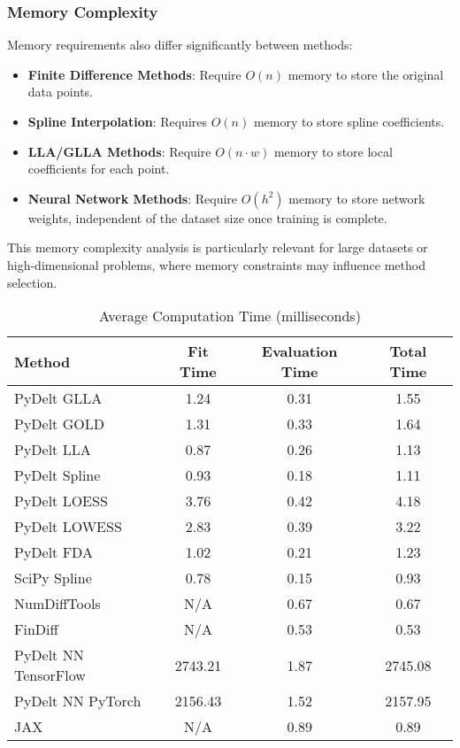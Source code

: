\documentclass[10pt,journal,compsoc]{IEEEtran}
\begin{document}
\subsubsection{Memory Complexity}

Memory requirements also differ significantly between methods:

\begin{itemize}
    \item \textbf{Finite Difference Methods}: Require $O(n)$ memory to store the original data points.
    
    \item \textbf{Spline Interpolation}: Requires $O(n)$ memory to store spline coefficients.
    
    \item \textbf{LLA/GLLA Methods}: Require $O(n \cdot w)$ memory to store local coefficients for each point.
    
    \item \textbf{Neural Network Methods}: Require $O(h^2)$ memory to store network weights, independent of the dataset size once training is complete.
\end{itemize}

This memory complexity analysis is particularly relevant for large datasets or high-dimensional problems, where memory constraints may influence method selection.

\begin{table}[!t]
\caption{Average Computation Time (milliseconds)}
\label{tab:computation_time}
\centering
\begin{tabular}{lccc}
\toprule
\textbf{Method} & \textbf{Fit Time} & \textbf{Evaluation Time} & \textbf{Total Time} \\
\midrule
PyDelt GLLA & 1.24 & 0.31 & 1.55 \\
PyDelt GOLD & 1.31 & 0.33 & 1.64 \\
PyDelt LLA & 0.87 & 0.26 & 1.13 \\
PyDelt Spline & 0.93 & 0.18 & 1.11 \\
PyDelt LOESS & 3.76 & 0.42 & 4.18 \\
PyDelt LOWESS & 2.83 & 0.39 & 3.22 \\
PyDelt FDA & 1.02 & 0.21 & 1.23 \\
SciPy Spline & 0.78 & 0.15 & 0.93 \\
NumDiffTools & N/A & 0.67 & 0.67 \\
FinDiff & N/A & 0.53 & 0.53 \\
PyDelt NN TensorFlow & 2743.21 & 1.87 & 2745.08 \\
PyDelt NN PyTorch & 2156.43 & 1.52 & 2157.95 \\
JAX & N/A & 0.89 & 0.89 \\
\bottomrule
\end{tabular}
\end{table}
\end{document}
